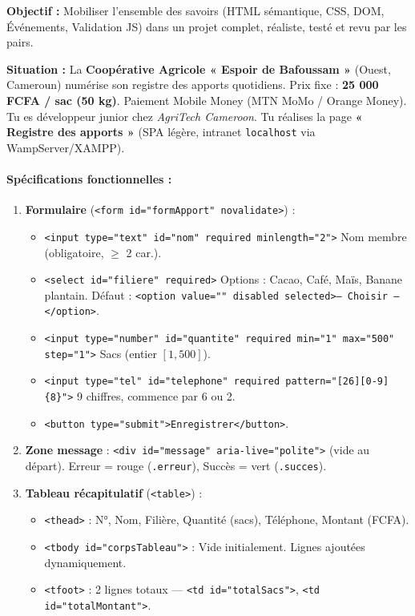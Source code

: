 \documentclass[11pt]{article}
\begin{document}
\begin{experience}
\textbf{Objectif :} Mobiliser l'ensemble des savoirs (HTML sémantique, CSS, DOM, Événements, Validation JS) dans un projet complet, réaliste, testé et revu par les pairs.

\textbf{Situation :} La \textbf{Coopérative Agricole « Espoir de Bafoussam »} (Ouest, Cameroun) numérise son registre des apports quotidiens. Prix fixe : \textbf{25 000 FCFA / sac (50 kg)}. Paiement Mobile Money (MTN MoMo / Orange Money). Tu es développeur junior chez \textit{AgriTech Cameroon}. Tu réalises la page \textbf{« Registre des apports »} (SPA légère, intranet \texttt{localhost} via WampServer/XAMPP).

\paragraph{Spécifications fonctionnelles :}
\begin{enumerate}
    \item \textbf{Formulaire} (\texttt{<form id="formApport" novalidate>}) :
    \begin{itemize}
        \item \texttt{<input type="text" id="nom" required minlength="2">} Nom membre (obligatoire, $\ge$ 2 car.).
        \item \texttt{<select id="filiere" required>} Options : Cacao, Café, Maïs, Banane plantain. Défaut : \texttt{<option value="" disabled selected>-- Choisir --</option>}.
        \item \texttt{<input type="number" id="quantite" required min="1" max="500" step="1">} Sacs (entier $[1, 500]$).
        \item \texttt{<input type="tel" id="telephone" required pattern="[26][0-9]\{8\}">} 9 chiffres, commence par 6 ou 2.
        \item \texttt{<button type="submit">Enregistrer</button>}.
    \end{itemize}
    \item \textbf{Zone message} : \texttt{<div id="message" aria-live="polite">} (vide au départ). Erreur = rouge (\texttt{.erreur}), Succès = vert (\texttt{.succes}).
    \item \textbf{Tableau récapitulatif} (\texttt{<table>}) :
    \begin{itemize}
        \item \texttt{<thead>} : N°, Nom, Filière, Quantité (sacs), Téléphone, Montant (FCFA).
        \item \texttt{<tbody id="corpsTableau">} : Vide initialement. Lignes ajoutées dynamiquement.
        \item \texttt{<tfoot>} : 2 lignes totaux — \texttt{<td id="totalSacs">}, \texttt{<td id="totalMontant">}.
    \end{itemize}
\end{enumerate}


\end{experience}
\end{document}
